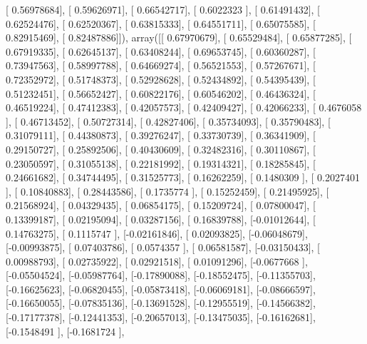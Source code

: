 \documentclass{article}
\begin{document}
       [ 0.56978684],
       [ 0.59626971],
       [ 0.66542717],
       [ 0.6022323 ],
       [ 0.61491432],
       [ 0.62524476],
       [ 0.62520367],
       [ 0.63815333],
       [ 0.64551711],
       [ 0.65075585],
       [ 0.82915469],
       [ 0.82487886]]), array([[ 0.67970679],
       [ 0.65529484],
       [ 0.65877285],
       [ 0.67919335],
       [ 0.62645137],
       [ 0.63408244],
       [ 0.69653745],
       [ 0.60360287],
       [ 0.73947563],
       [ 0.58997788],
       [ 0.64669274],
       [ 0.56521553],
       [ 0.57267671],
       [ 0.72352972],
       [ 0.51748373],
       [ 0.52928628],
       [ 0.52434892],
       [ 0.54395439],
       [ 0.51232451],
       [ 0.56652427],
       [ 0.60822176],
       [ 0.60546202],
       [ 0.46436324],
       [ 0.46519224],
       [ 0.47412383],
       [ 0.42057573],
       [ 0.42409427],
       [ 0.42066233],
       [ 0.4676058 ],
       [ 0.46713452],
       [ 0.50727314],
       [ 0.42827406],
       [ 0.35734093],
       [ 0.35790483],
       [ 0.31079111],
       [ 0.44380873],
       [ 0.39276247],
       [ 0.33730739],
       [ 0.36341909],
       [ 0.29150727],
       [ 0.25892506],
       [ 0.40430609],
       [ 0.32482316],
       [ 0.30110867],
       [ 0.23050597],
       [ 0.31055138],
       [ 0.22181992],
       [ 0.19314321],
       [ 0.18285845],
       [ 0.24661682],
       [ 0.34744495],
       [ 0.31525773],
       [ 0.16262259],
       [ 0.1480309 ],
       [ 0.2027401 ],
       [ 0.10840883],
       [ 0.28443586],
       [ 0.1735774 ],
       [ 0.15252459],
       [ 0.21495925],
       [ 0.21568924],
       [ 0.04329435],
       [ 0.06854175],
       [ 0.15209724],
       [ 0.07800047],
       [ 0.13399187],
       [ 0.02195094],
       [ 0.03287156],
       [ 0.16839788],
       [-0.01012644],
       [ 0.14763275],
       [ 0.1115747 ],
       [-0.02161846],
       [ 0.02093825],
       [-0.06048679],
       [-0.00993875],
       [ 0.07403786],
       [ 0.0574357 ],
       [ 0.06581587],
       [-0.03150433],
       [ 0.00988793],
       [ 0.02735922],
       [ 0.02921518],
       [ 0.01091296],
       [-0.0677668 ],
       [-0.05504524],
       [-0.05987764],
       [-0.17890088],
       [-0.18552475],
       [-0.11355703],
       [-0.16625623],
       [-0.06820455],
       [-0.05873418],
       [-0.06069181],
       [-0.08666597],
       [-0.16650055],
       [-0.07835136],
       [-0.13691528],
       [-0.12955519],
       [-0.14566382],
       [-0.17177378],
       [-0.12441353],
       [-0.20657013],
       [-0.13475035],
       [-0.16162681],
       [-0.1548491 ],
       [-0.1681724 ],
\end{document}
